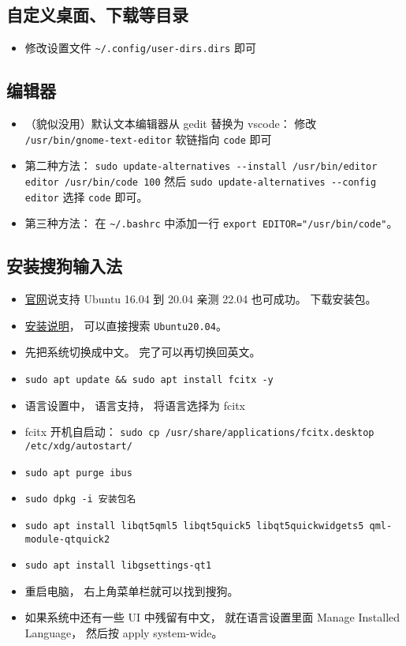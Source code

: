 \subsection{自定义桌面、下载等目录}
\begin{itemize}
\item 修改设置文件 \verb|~/.config/user-dirs.dirs| 即可
\end{itemize}

\subsection{编辑器}
\begin{itemize}
\item （貌似没用）默认文本编辑器从 gedit 替换为 vscode： 修改 \verb`/usr/bin/gnome-text-editor` 软链指向 \verb`code` 即可
\item 第二种方法： \verb|sudo update-alternatives --install /usr/bin/editor editor /usr/bin/code 100| 然后 \verb|sudo update-alternatives --config editor| 选择 \verb|code| 即可。
\item 第三种方法： 在 \verb|~/.bashrc| 中添加一行 \verb|export EDITOR="/usr/bin/code"|。
\end{itemize}

\subsection{安装搜狗输入法}
\begin{itemize}
\item \href{https://shurufa.sogou.com/linux}{官网}说支持 Ubuntu 16.04 到 20.04 亲测 22.04 也可成功。 下载安装包。
\item \href{https://shurufa.sogou.com/linux/guide}{安装说明}， 可以直接搜索 \verb|Ubuntu20.04|。
\item 先把系统切换成中文。 完了可以再切换回英文。
\item \verb|sudo apt update && sudo apt install fcitx -y|
\item 语言设置中， 语言支持， 将语言选择为 fcitx
\item fcitx 开机自启动： \verb|sudo cp /usr/share/applications/fcitx.desktop /etc/xdg/autostart/|
\item \verb|sudo apt purge ibus|
\item \verb|sudo dpkg -i 安装包名|
\item \verb|sudo apt install libqt5qml5 libqt5quick5 libqt5quickwidgets5 qml-module-qtquick2|
\item \verb|sudo apt install libgsettings-qt1|
\item 重启电脑， 右上角菜单栏就可以找到搜狗。
\item 如果系统中还有一些 UI 中残留有中文， 就在语言设置里面 Manage Installed Language， 然后按 apply system-wide。
\end{itemize}

